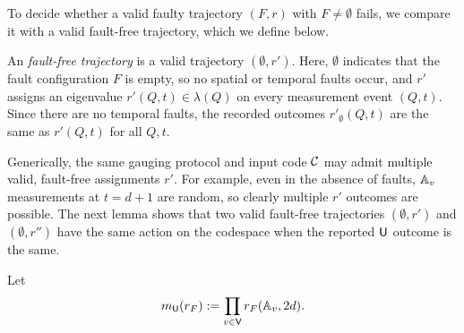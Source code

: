 \documentclass[11pt]{article}
\begin{document}
To decide whether a valid faulty trajectory $(F,r)$ with $F\neq \emptyset$ fails, we compare it with a valid fault-free trajectory, which we define below.

\begin{definition}
    An \emph{fault-free trajectory} is a valid trajectory $(\emptyset, r')$. Here, $\emptyset$ indicates that the fault configuration $F$ is empty, so no spatial or temporal faults occur, and
    $r'$ assigns an eigenvalue $r'(Q,t)\in \lambda(Q)$ on every measurement event $(Q,t)$. Since there are no temporal faults, the recorded outcomes $r'_{\emptyset}(Q,t)$ are the same as $r'(Q,t)$ for all $Q,t$. 
\end{definition}
Generically, the same gauging protocol and input code $\mathcal{C}$ may admit multiple valid, fault-free assignments $r'$. For example, even in the absence of faults, $\mathbb{A}_v$ measurements at $t=d+1$ are random, so clearly multiple $r'$ outcomes are possible.
The next lemma shows that two valid fault-free trajectories $(\emptyset,r')$ and $(\emptyset,r'')$ have the same action on the codespace when the reported $\mathsf{U}$ outcome is the same.

Let 
\[
m_{\mathsf{U}}(r_F) := \prod_{v\in \mathsf{V}} r_F(\mathbb{A}_v,2d).
\]
\end{document}
